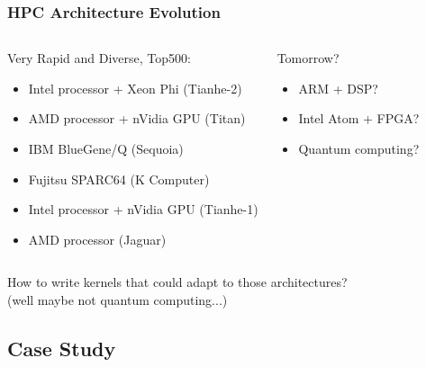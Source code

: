 \documentclass{beamer}
\begin{document}
\begin{frame}
  \frametitle{HPC Architecture Evolution}

  \begin{columns}

  \begin{block}{\footnotesize Very Rapid and Diverse, Top500:}
    \begin{itemize}
      \item \scriptsize Intel processor + Xeon Phi (Tianhe-2)
      \item \scriptsize AMD processor + nVidia GPU (Titan)
      \item \scriptsize IBM BlueGene/Q (Sequoia)
      \item \scriptsize Fujitsu SPARC64 (K Computer)
      \item \scriptsize Intel processor + nVidia GPU (Tianhe-1)
      \item \scriptsize AMD processor (Jaguar)
    \end{itemize}
  \end{block}

  \begin{block}{\footnotesize Tomorrow?}
    \begin{itemize}
      \item \scriptsize ARM + DSP?
      \item \scriptsize Intel Atom + FPGA?
      \item \scriptsize Quantum computing?
    \end{itemize}
  \end{block}

  \end{columns}

  \vspace{1cm}
  How to write kernels that could adapt to those architectures?\\
  (well maybe not quantum computing...)

\end{frame}


\subsection{Case Study}
\end{document}
